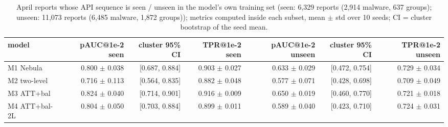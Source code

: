 \begin{table}[t]
\centering
\small
\caption{April reports whose API sequence is seen / unseen in the model's own training set (seen: 6,329 reports (2,914 malware, 637 groups); unseen: 11,073 reports (6,485 malware, 1,872 groups)); metrics computed inside each subset, mean $\pm$ std over 10 seeds; CI = cluster bootstrap of the seed mean.}
\label{tab:T6_seen_unseen}
\begin{tabular}{lrrrrrr}
\toprule
model & pAUC@1e-2 seen & cluster 95\% CI & TPR@1e-2 seen & pAUC@1e-2 unseen & cluster 95\% CI & TPR@1e-2 unseen \\
\midrule
M1 Nebula & 0.800 $\pm$ 0.038 & [0.687, 0.884] & 0.903 $\pm$ 0.027 & 0.633 $\pm$ 0.029 & [0.472, 0.754] & 0.729 $\pm$ 0.034 \\
M2 two-level & 0.716 $\pm$ 0.113 & [0.564, 0.835] & 0.882 $\pm$ 0.048 & 0.577 $\pm$ 0.071 & [0.428, 0.698] & 0.709 $\pm$ 0.049 \\
M3 ATT+bal & 0.824 $\pm$ 0.040 & [0.714, 0.901] & 0.916 $\pm$ 0.009 & 0.650 $\pm$ 0.019 & [0.460, 0.770] & 0.721 $\pm$ 0.018 \\
M4 ATT+bal-2L & 0.804 $\pm$ 0.050 & [0.703, 0.884] & 0.899 $\pm$ 0.011 & 0.589 $\pm$ 0.040 & [0.423, 0.710] & 0.724 $\pm$ 0.031 \\
\bottomrule
\end{tabular}
\end{table}
